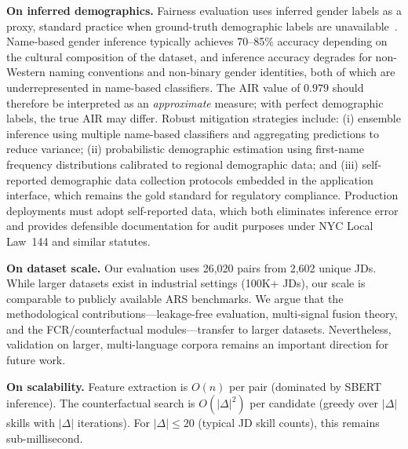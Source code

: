 \documentclass[smallcondensed,numbers]{sn-jnl}
\begin{document}
\textbf{On inferred demographics.} Fairness evaluation uses inferred gender labels as a proxy, standard practice when ground-truth demographic labels are unavailable~\cite{buolamwini2018gender}. Name-based gender inference typically achieves 70--85\% accuracy depending on the cultural composition of the dataset, and inference accuracy degrades for non-Western naming conventions and non-binary gender identities, both of which are underrepresented in name-based classifiers. The AIR value of $0.979$ should therefore be interpreted as an \textit{approximate} measure; with perfect demographic labels, the true AIR may differ. Robust mitigation strategies include: (i) ensemble inference using multiple name-based classifiers and aggregating predictions to reduce variance; (ii) probabilistic demographic estimation using first-name frequency distributions calibrated to regional demographic data; and (iii) self-reported demographic data collection protocols embedded in the application interface, which remains the gold standard for regulatory compliance. Production deployments must adopt self-reported data, which both eliminates inference error and provides defensible documentation for audit purposes under NYC Local Law~144 and similar statutes.

\textbf{On dataset scale.} Our evaluation uses 26,020 pairs from 2,602 unique JDs. While larger datasets exist in industrial settings (100K+ JDs), our scale is comparable to publicly available ARS benchmarks. We argue that the methodological contributions---leakage-free evaluation, multi-signal fusion theory, and the FCR/counterfactual modules---transfer to larger datasets. Nevertheless, validation on larger, multi-language corpora remains an important direction for future work.

\textbf{On scalability.} Feature extraction is $O(n)$ per pair (dominated by SBERT inference). The counterfactual search is $O(|\Delta|^2)$ per candidate (greedy over $|\Delta|$ skills with $|\Delta|$ iterations). For $|\Delta| \leq 20$ (typical JD skill counts), this remains sub-millisecond.
\end{document}

